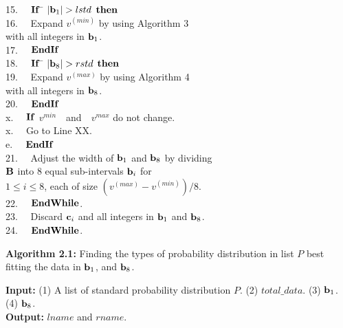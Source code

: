 \documentclass[lettersize,journal]{IEEEtran}
\begin{document}
\begin{tabbing}
15.~~\>               \>               \> ${\bf If}$ \= $|{\bf b}_{1}| > lstd$ ${\bf then}$ \\
16.~~\>               \>               \>            \> Expand $v^{(min)}$ by using Algorithm 3 \\
     \>               \>               \>            \> with all integers in ${\bf b}_{1}$. \\
17.~~\>               \>               \> ${\bf EndIf}$ \\
18.~~\>               \>               \> ${\bf If}$ \= $|{\bf b}_{8}| > rstd$ ${\bf then}$ \\
19.~~\>               \>               \>            \> Expand $v^{(max)}$ by using Algorithm 4 \\
     \>               \>               \>            \> with all integers in ${\bf b}_{8}$. \\
20.~~\>               \>               \> ${\bf EndIf}$ \\
x.~~\>               \>               \> ${\bf If}$\,\,$v^{min}$ \,\, and \,\, $v^{max}$\,\,do not change.  \\
x.~~\>               \>               \> \> Go to Line XX.\\

e.~~\>               \>               \> ${\bf EndIf}$ \\
21.~~\>               \>               \> Adjust the width of ${\bf b}_{1}$ and ${\bf b}_{8}$ by dividing\\
     \>               \>               \> ${\bf B}$ into 8 equal sub-intervals ${\bf b}_{i}$ for \\
     \>               \>               \> $1 \leq i \leq 8$, each of size {\small 
                                          $(v^{(max)} - v^{(min)})/8$}. \\
22.~~\>               \> ${\bf EndWhile}$. \\
23.~~\>               \> Discard ${\bf c}_{i}$ and all integers in ${\bf b}_{1}$ and ${\bf b}_{8}$. \\
24.~~\> ${\bf EndWhile}$.      
\end{tabbing}

\vspace{0.2in}
\noindent
{\bf Algorithm 2.1:} Finding the types of probability distribution in list $P$ best fitting the data in 
${\bf b}_{1}$, and ${\bf b}_{8}$.

\noindent
{\bf Input:} (1) A list of standard probability distribution $P$. (2) $total\_data$. (3) ${\bf b}_{1}$.
(4) ${\bf b}_{8}$. \\
{\bf Output:} $lname$ and $rname$.
\end{document}
